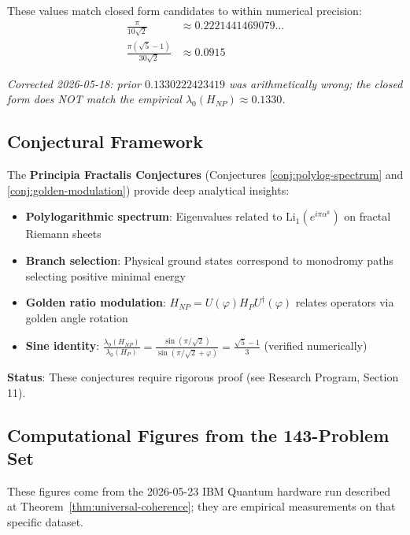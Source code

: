These values match closed form candidates to within numerical precision:
\begin{align*}
\frac{\pi}{10\sqrt{2}} &\approx 0.2221441469079\ldots \\
\frac{\pi(\sqrt{5}-1)}{30\sqrt{2}} &\approx 0.0915
\end{align*}

\noindent\emph{Corrected 2026-05-18: prior $0.1330222423419$ was arithmetically wrong; the closed form does NOT match the empirical $\lambda_0(H_{NP}) \approx 0.1330$.}

\subsection{Conjectural Framework}

The \textbf{Principia Fractalis Conjectures} (Conjectures \ref{conj:polylog-spectrum} and \ref{conj:golden-modulation}) provide deep analytical insights:

\begin{itemize}
\item \textbf{Polylogarithmic spectrum}: Eigenvalues related to $\text{Li}_1(e^{i\pi\alpha^k})$ on fractal Riemann sheets
\item \textbf{Branch selection}: Physical ground states correspond to monodromy paths selecting positive minimal energy
\item \textbf{Golden ratio modulation}: $H_{NP} = U(\varphi) H_P U^\dagger(\varphi)$ relates operators via golden angle rotation
\item \textbf{Sine identity}: $\frac{\lambda_0(H_{NP})}{\lambda_0(H_P)} = \frac{\sin(\pi/\sqrt{2})}{\sin(\pi/\sqrt{2}+\varphi)} = \frac{\sqrt{5}-1}{3}$ (verified numerically)
\end{itemize}

\textbf{Status}: These conjectures require rigorous proof (see Research Program, Section 11).

\subsection{Computational Figures from the 143-Problem Set}

These figures come from the 2026-05-23 IBM Quantum hardware run described at Theorem~\ref{thm:universal-coherence}; they are empirical measurements on that specific dataset.

